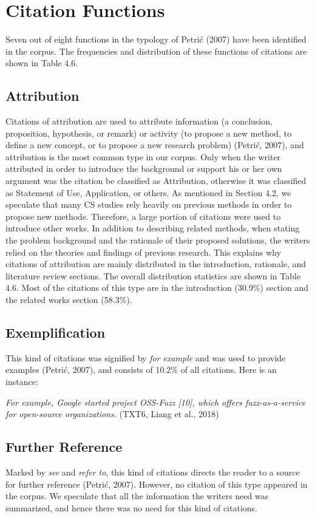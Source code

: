 \section{Citation Functions}
Seven out of eight functions in the typology of Petrić (2007) have been identified in the corpus. The frequencies and distribution of these functions of citations are shown in Table 4.6.

\subsection{Attribution}
Citations of attribution are used to attribute information (a conclusion, proposition, hypothesis, or remark) or activity (to propose a new method, to define a new concept, or to propose a new research problem) (Petrić, 2007), and attribution is the most common type in our corpus. Only when the writer attributed in order to introduce the background or support his or her own argument was the citation be classified as Attribution, otherwise it was classified as Statement of Use, Application, or others. As mentioned in Section 4.2, we speculate that many CS studies rely heavily on previous methods in order to propose new methods. Therefore, a large portion of citations were used to introduce other works. In addition to describing related methods, when stating the problem background and the rationale of their proposed solutions, the writers relied on the theories and findings of previous research. This explains why citations of attribution are mainly distributed in the introduction, rationale, and literature review sections. The overall distribution statistics are shown in Table 4.6. Most of the citations of this type are in the introduction (30.9\%) section and the related works section (58.3\%).

\subsection{Exemplification}
This kind of citations was signified by \textit{for example} and was used to provide examples (Petrić, 2007), and consists of 10.2\% of all citations. Here is an instance:

\textit{For example, Google started project OSS-Fuzz [10], which offers fuzz-as-a-service for open-source organizations.} (TXT6, Liang et al., 2018)

\subsection{Further Reference}
Marked by \textit{see} and \textit{refer to}, this kind of citations directs the reader to a source for further reference (Petrić, 2007). However, no citation of this type appeared in the corpus. We speculate that all the information the writers need was summarized, and hence there was no need for this kind of citations.


